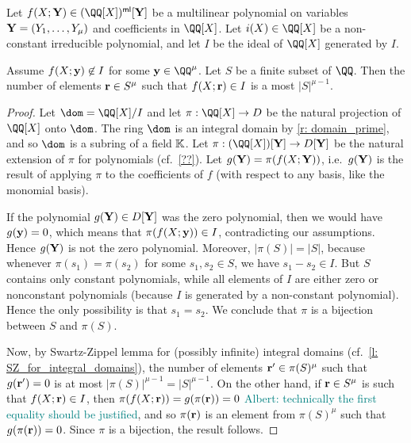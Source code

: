 \documentclass[11pt,letterpaper,usenames,dvipsnames]{article}
\newcommand{\albert}[1]{\textcolor{teal}{Albert: {#1}}}
\begin{document}
  \begin{lemma}
  Let $f(X;\YY) \in (\QQ[X])^{\multilin}[\YY]$ be a multilinear polynomial on variables $\mathbf{Y}= (Y_1,\ldots, Y_\mu)$ and coefficients in $\QQ[X]$. Let $i(X) \in \QQ[X]$ be a non-constant irreducible polynomial, and let $I$ be the ideal of $\QQ[X]$ generated by $I$. 
  
  Assume $f(X;\mathbf{y})\not\in I$ for some $\yy\in \QQ^\mu$. Let $S$ be a finite subset of $\QQ$. Then the number of elements $\mathbf{r}\in S^\mu$ such that $f(X;\mathbf{r})\in I$ is a most $|S|^{\mu-1}$.
  \end{lemma}
  \begin{proof}
  Let $\dom= \QQ[X]/I$ and let  $\pi:\QQ[X] \to D$ be the natural projection of $\QQ[X]$ onto $\dom$. The ring $\dom$ is an integral domain by \cref{r: domain_prime}, and so $\dom$ is a subring of a field $\mathbb{K}$. Let $\pi:(\QQ[X])[\YY]\to D[\YY]$ be the natural extension of $\pi$ for polynomials (cf.\ \cref{??}). Let $g(\mathbf{Y}) = \pi(f(X;\mathbf{Y}))$, i.e.\ $g(\mathbf{Y})$ is the result of applying $\pi$ to the coefficients of $f$ (with respect to any basis, like the monomial basis). 
  
    If the polynomial $g(\mathbf{Y}) \in D[\mathbf{Y}]$ was the zero polynomial, then we would have $g(\mathbf{y}) = 0$, which means that $\pi(f(X;\mathbf{y}))\in I$, contradicting our assumptions. Hence $g(\mathbf{Y})$ is not the zero polynomial. Moreover, $|\pi(S)|=|S|$, because whenever $\pi(s_1) = \pi(s_2)$ for some $s_1,s_2\in S$, we have $s_1 - s_2 \in  I$. But $S$ contains only constant polynomials, while all elements of $I$ are either zero or nonconstant polynomials (because $I$ is generated by a non-constant polynomial). Hence the only possibility is that $s_1=s_2$.  We conclude that $\pi$ is a bijection between $S$ and $\pi(S)$.
    
    Now, by Swartz-Zippel lemma for (possibly infinite) integral domains (cf.\ \cref{l: SZ_for_integral_domains}), the number of elements $\mathbf{r}'\in \pi(S)^\mu$ such that $g(\mathbf{r}')=0$ is at most $|\pi(S)|^{\mu-1}= |S|^{\mu-1}$. On the other hand, if $\mathbf{r}\in S^\mu$ is such that $f(X;\mathbf{r})\in I$, then $\pi(f(X;\mathbf{r}))=g(\pi(\mathbf{r}))=0$ \albert{technically the first equality should be justified}, and so $\pi(\mathbf{r})$ is an element from $\pi(S)^{\mu}$ such that $g(\pi(\mathbf{r}))=0$. Since $\pi$ is a bijection, the result follows.
  \end{proof}
\end{document}
